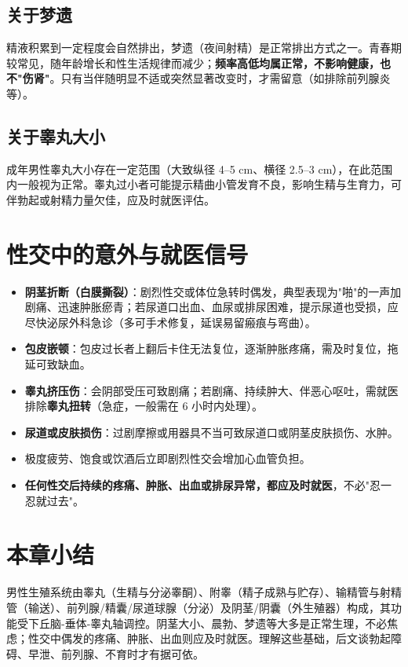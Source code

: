 \documentclass[12pt,UTF8,openany]{ctexbook}
\begin{document}
\subsection*{关于梦遗}

精液积累到一定程度会自然排出，梦遗（夜间射精）是正常排出方式之一。青春期较常见，随年龄增长和性生活规律而减少；\textbf{频率高低均属正常，不影响健康，也不"伤肾"}。只有当伴随明显不适或突然显著改变时，才需留意（如排除前列腺炎等）。

\subsection*{关于睾丸大小}

成年男性睾丸大小存在一定范围（大致纵径 4--5 cm、横径 2.5--3 cm），在此范围内一般视为正常。睾丸过小者可能提示精曲小管发育不良，影响生精与生育力，可伴勃起或射精力量欠佳，应及时就医评估。

\section{性交中的意外与就医信号}

\begin{itemize}[leftmargin=2em,itemsep=0.3em]
  \item \textbf{阴茎折断（白膜撕裂）}：剧烈性交或体位急转时偶发，典型表现为"啪"的一声加剧痛、迅速肿胀瘀青；若尿道口出血、血尿或排尿困难，提示尿道也受损，应尽快泌尿外科急诊（多可手术修复，延误易留瘢痕与弯曲）。
  \item \textbf{包皮嵌顿}：包皮过长者上翻后卡住无法复位，逐渐肿胀疼痛，需及时复位，拖延可致缺血。
  \item \textbf{睾丸挤压伤}：会阴部受压可致剧痛；若剧痛、持续肿大、伴恶心呕吐，需就医排除\textbf{睾丸扭转}（急症，一般需在 6 小时内处理）。
  \item \textbf{尿道或皮肤损伤}：过剧摩擦或用器具不当可致尿道口或阴茎皮肤损伤、水肿。
  \item 极度疲劳、饱食或饮酒后立即剧烈性交会增加心血管负担。
  \item \textbf{任何性交后持续的疼痛、肿胀、出血或排尿异常，都应及时就医}，不必"忍一忍就过去"。
\end{itemize}

\section{本章小结}

男性生殖系统由睾丸（生精与分泌睾酮）、附睾（精子成熟与贮存）、输精管与射精管（输送）、前列腺/精囊/尿道球腺（分泌）及阴茎/阴囊（外生殖器）构成，其功能受下丘脑-垂体-睾丸轴调控。阴茎大小、晨勃、梦遗等大多是正常生理，不必焦虑；性交中偶发的疼痛、肿胀、出血则应及时就医。理解这些基础，后文谈勃起障碍、早泄、前列腺、不育时才有据可依。
\end{document}
